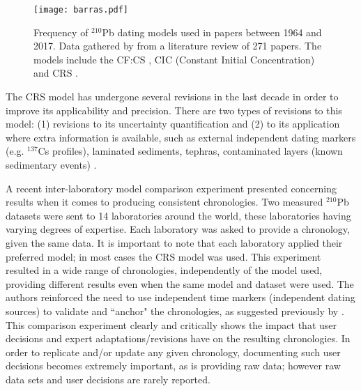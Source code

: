 \documentclass [10pt] {article}
\begin{document}
\begin{figure}[h!]
	\begin{centering}
		\texttt{[image: barras.pdf]}
		\caption{Frequency of $^{210}$Pb dating models used in papers between 1964 and 2017. Data gathered by \citet{Courtney2019} from a literature review of 271 papers. The models include the CF:CS \citep[Constant Flux - Constant Sedimentation;][]{Robbins1978}, CIC (Constant Initial Concentration) \citep{Goldberg1963,Crozaz1964,Robbins1978} and CRS  \citep[Constant Rate of Supply;][]{Appleby1978,Robbins1978}. }
		\label{fig:210models}
	\end{centering}
\end{figure}

	The CRS model has undergone several revisions in the last decade in order to improve its applicability and precision. 
There are two types of revisions to this model: (1) revisions to its uncertainty quantification \citep[eg. ][]{Binford1990,Appleby2001,Sanchez-Cabeza2014} and (2) to its application where extra information is available, such as external independent dating markers (e.g. $^{137}$Cs profiles), laminated sediments, tephras, contaminated layers (known sedimentary events) \citep[e.g.][]{Appleby1998,Appleby2001,Appleby2008}. 

	A recent inter-laboratory model comparison experiment \citep{Barsanti2020} presented concerning results when it comes to producing consistent chronologies.
Two measured $^{210}$Pb datasets were sent to 14 laboratories around the world, these laboratories having varying degrees of expertise.
Each laboratory was asked to provide a chronology, given the same data. 
It is important to note that each laboratory applied their preferred model; in most cases the CRS model was used.
This experiment resulted in a wide range of chronologies, independently of the model used, providing different results even when the same model and dataset were used.
The authors reinforced the need to use independent time markers (independent dating sources) to validate and ``anchor" the chronologies, as suggested previously by \citet{Smith2001}.  
This comparison experiment clearly and critically shows the impact that user decisions and expert adaptations/revisions have on the resulting chronologies.
In order to replicate and/or update any given chronology, documenting such user decisions becomes extremely important, as is providing raw data; however raw data sets and user decisions are rarely reported.
\end{document}
